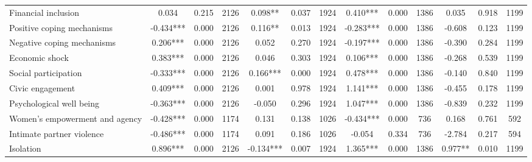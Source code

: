 \begin{tabular}{l*{12}{c}}
 Financial inclusion &        0.034 &        0.215 & 2126    &        0.098** &        0.037 & 1924    &        0.410*** &        0.000 & 1386 &        0.035 &        0.918 & 1199 \\ 

 Positive coping mechanisms &       -0.434*** &        0.000 & 2126    &        0.116** &        0.013 & 1924    &       -0.283*** &        0.000 & 1386 &       -0.608 &        0.123 & 1199 \\ 

 Negative coping mechanisms &        0.206*** &        0.000 & 2126    &        0.052 &        0.270 & 1924    &       -0.197*** &        0.000 & 1386 &       -0.390 &        0.284 & 1199 \\ 

 Economic shock &        0.383*** &        0.000 & 2126    &        0.046 &        0.303 & 1924    &        0.106*** &        0.000 & 1386 &       -0.268 &        0.539 & 1199 \\ 

 Social participation &       -0.333*** &        0.000 & 2126    &        0.166*** &        0.000 & 1924    &        0.478*** &        0.000 & 1386 &       -0.140 &        0.840 & 1199 \\ 

 Civic engagement &        0.409*** &        0.000 & 2126    &        0.001 &        0.978 & 1924    &        1.141*** &        0.000 & 1386 &       -0.455 &        0.178 & 1199 \\ 

 Psychological well being &       -0.363*** &        0.000 & 2126    &       -0.050 &        0.296 & 1924    &        1.047*** &        0.000 & 1386 &       -0.839 &        0.232 & 1199 \\ 

 Women's empowerment and agency &       -0.428*** &        0.000 & 1174    &        0.131 &        0.138 & 1026    &       -0.434*** &        0.000 & 736 &        0.168 &        0.761 & 592 \\ 

 Intimate partner violence &       -0.486*** &        0.000 & 1174    &        0.091 &        0.186 & 1026    &       -0.054 &        0.334 & 736 &       -2.784 &        0.217 & 594 \\ 

 Isolation &        0.896*** &        0.000 & 2126    &       -0.134*** &        0.007 & 1924    &        1.365*** &        0.000 & 1386 &        0.977** &        0.010 & 1199 \\ 


\end{tabular}

